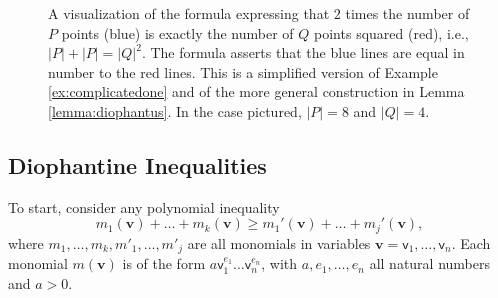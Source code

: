\documentclass[12pt,oneside,reqno]{amsart}
\theoremstyle{definition}
\begin{document}
\begin{figure}
    \caption{A visualization of the formula expressing that  $2$ times the number of $P$ points (blue) is exactly the number of $Q$ points squared (red), i.e., $ |P|+|P| = |Q|^2$. The formula asserts that the blue lines are equal in number to the red lines. This is a simplified version of Example \ref{ex:complicatedone} and of the more general construction in Lemma \ref{lemma:diophantus}. In the case pictured, $|P|=8$ and $|Q|=4$.}\label{fig:multiply}
\end{figure}

\subsection{Diophantine Inequalities}

To start, consider any polynomial inequality  \begin{equation} m_1(\mathbf{v}) + \dots + m_k(\mathbf{v}) \geq m_1'(\mathbf{v}) + \dots + m_j'(\mathbf{v}), \label{in-diophantus}\end{equation} where $m_1,\dots,m_k,m'_1,\dots,m'_j$ are all monomials in variables $\mathbf{v} = \mathsf{v}_1,\dots,\mathsf{v}_n$. Each monomial $m(\mathbf{v})$ is of the form $a \mathsf{v}_1^{e_1}\dots \mathsf{v}_n^{e_n}$, with $a,e_1,\dots,e_n$ all natural numbers and $a>0$. 
\end{document}
